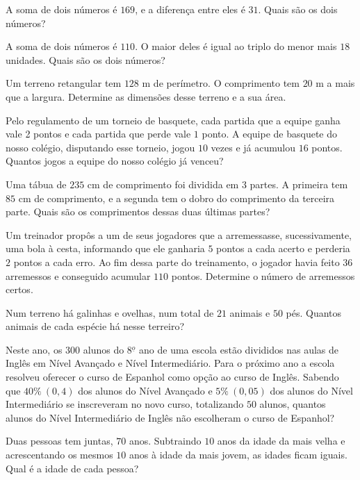	\item A soma de dois números é $169$, e a diferença entre eles é $31$. Quais são os dois números?
	
	\item A soma de dois números é $110$. O maior deles é igual ao triplo do menor mais $18$ unidades. Quais são os dois números?
	
	\item Um terreno retangular tem $128$ m de perímetro. O comprimento tem $20$ m a mais que a largura. Determine as dimensões desse terreno e a sua área.
	
	\item Pelo regulamento de um torneio de basquete, cada partida que a equipe ganha vale 2 pontos e cada partida que perde vale $1$ ponto. A equipe de basquete do nosso colégio, disputando esse torneio, jogou $10$ vezes e já acumulou $16$ pontos. Quantos jogos a equipe do nosso colégio já venceu?
	
	\item Uma tábua de $235$ cm de comprimento foi dividida em $3$ partes. A primeira tem $85$ cm de comprimento, e a segunda tem o dobro do comprimento da terceira parte. Quais são os comprimentos dessas duas últimas partes?
	
	\item Um treinador propôs a um de seus jogadores que a arremessasse, sucessivamente, uma bola à cesta, informando que ele ganharia $5$ pontos a cada acerto e perderia $2$ pontos a cada erro. Ao fim dessa parte do treinamento, o jogador havia feito $36$ arremessos e conseguido acumular $110$ pontos. Determine o número de arremessos certos.
	
	\item Num terreno há galinhas e ovelhas, num total de $21$ animais e $50$ pés. Quantos animais de cada espécie há nesse terreiro?
	
	\item Neste ano, os $300$ alunos do 8$^{\underline{o}}$ ano de uma escola estão divididos nas aulas de Inglês em Nível Avançado e Nível Intermediário. Para o próximo ano a escola resolveu oferecer o curso de Espanhol como opção ao curso de Inglês. Sabendo que $40\%\ (0,4)$ dos alunos do Nível Avançado e $5\%\ (0,05)$ dos alunos do Nível Intermediário se inscreveram no novo curso, totalizando $50$ alunos, quantos alunos do Nível Intermediário de Inglês não escolheram o curso de Espanhol?
	
	\item Duas pessoas tem juntas, $70$ anos. Subtraindo $10$ anos da idade da mais velha e acrescentando os mesmos $10$ anos à idade da mais jovem, as idades ficam iguais. Qual é a idade de cada pessoa?
	
